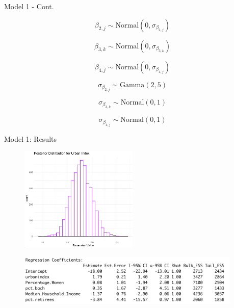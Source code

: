 \documentclass{beamer}
\begin{document}
\begin{frame}{Model 1 - Cont.}

\[\beta_{2,j} \sim \text{Normal}(0, \sigma_{\beta_{2,j}})\]

\[\beta_{3,k} \sim \text{Normal}(0, \sigma_{\beta_{3,k}})\]

\[\beta_{4,j} \sim \text{Normal}(0, \sigma_{\beta_{4,j}})\]

\[\sigma_{\beta_{2,j}} \sim \text{Gamma}(2,5) \]

\[\sigma_{\beta_{3,k}} \sim \text{Normal}(0,1) \]

\[\sigma_{\beta_{4,j}} \sim \text{Normal}(0,1) \]

\end{frame}


\begin{frame}{Model 1: Results}
    \begin{center}
        \begin{figure}
            \includegraphics[width=0.5\textwidth]{plots/post_urbanindex_model1.png}
        \end{figure}
        \begin{figure}
            \includegraphics[width=0.95\textwidth]{plots/model1_summary_output.png}
        \end{figure}
    \end{center}
\end{frame}
\end{document}
